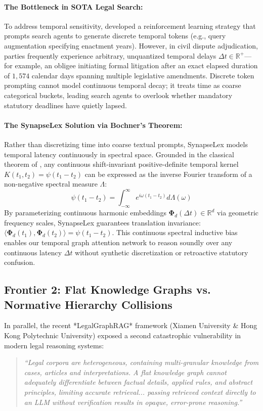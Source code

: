 \documentclass[11pt,a4paper]{article}
\begin{document}
\paragraph{The Bottleneck in SOTA Legal Search:} To address temporal sensitivity, \citet{fan2026legalsearch} developed a reinforcement learning strategy that prompts search agents to generate discrete temporal tokens (e.g., query augmentation specifying enactment years). However, in civil dispute adjudication, parties frequently experience arbitrary, unquantized temporal delays $\Delta t \in \mathbb{R}^+$---for example, an obligee initiating formal litigation after an exact elapsed duration of $1,574$ calendar days spanning multiple legislative amendments. Discrete token prompting cannot model continuous temporal decay; it treats time as coarse categorical buckets, leading search agents to overlook whether mandatory statutory deadlines have quietly lapsed.

\paragraph{The SynapseLex Solution via Bochner's Theorem:} Rather than discretizing time into coarse textual prompts, SynapseLex models temporal latency continuously in spectral space. Grounded in the classical theorem of \citet{bochner1959lectures}, any continuous shift-invariant positive-definite temporal kernel $K(t_1, t_2) = \psi(t_1 - t_2)$ can be expressed as the inverse Fourier transform of a non-negative spectral measure $\Lambda$:
\begin{equation}
\psi(t_1 - t_2) = \int_{-\infty}^{\infty} e^{i \omega (t_1 - t_2)} d\Lambda(\omega)
\end{equation}
By parameterizing continuous harmonic embeddings $\mathbf{\Phi}_d(\Delta t) \in \mathbb{R}^d$ via geometric frequency scales, SynapseLex guarantees translation invariance: $\langle \mathbf{\Phi}_d(t_1), \mathbf{\Phi}_d(t_2) \rangle = \psi(t_1 - t_2)$. This continuous spectral inductive bias enables our temporal graph attention network to reason soundly over any continuous latency $\Delta t$ without synthetic discretization or retroactive statutory confusion.

\subsection{Frontier 2: Flat Knowledge Graphs vs. Normative Hierarchy Collisions}
In parallel, the recent *LegalGraphRAG* framework \citep{chen2026legalgraphrag} (Xiamen University \& Hong Kong Polytechnic University) exposed a second catastrophic vulnerability in modern legal reasoning systems:
\begin{quote}
\textit{``Legal corpora are heterogeneous, containing multi-granular knowledge from cases, articles and interpretations. A flat knowledge graph cannot adequately differentiate between factual details, applied rules, and abstract principles, limiting accurate retrieval... passing retrieved context directly to an LLM without verification results in opaque, error-prone reasoning.''} \citep[p.~1]{chen2026legalgraphrag}
\end{quote}
\end{document}
